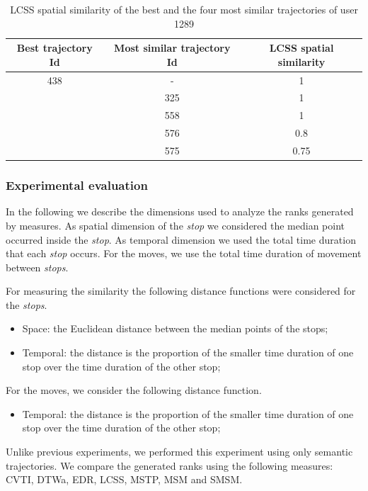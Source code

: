 \documentclass[12pt]{article}
\begin{document}
\begin{table}[!h]
\scriptsize
  \centering
  \begin{tabular}{|c|c|c|}
  	\hline
 Best trajectory Id & Most similar trajectory Id & LCSS spatial similarity \\
  	\hline
 438 & - & 1 \\
  & 325 & 1 \\
  & 558 & 1 \\
  & 576 & 0.8 \\
  & 575 & 0.75 \\
    \hline
  \end{tabular}
  \caption{LCSS spatial similarity of the best and the four most similar trajectories of user 1289}
  \label{tab:involves_best_similarities}
\end{table}


\subsubsection{Experimental evaluation}
In the following we describe the dimensions used to analyze the ranks generated by measures. As spatial dimension of the \emph{stop} we considered the median point occurred inside the \emph{stop}. As temporal dimension we used the total time duration that each \emph{stop} occurs. For the moves, we use the total time duration of movement between \emph{stops}.

For measuring the similarity the following distance functions were considered for the \emph{stops}.

\begin{itemize}
  \item Space: the Euclidean distance between the median points of the stops;
  \item Temporal: the distance is the proportion of the smaller time duration of one stop over the time duration of the other stop;
\end{itemize}

For the moves, we consider the following distance function.
\begin{itemize}
  \item Temporal: the distance is the proportion of the smaller time duration of one stop over the time duration of the other stop;
\end{itemize}

Unlike previous experiments, we performed this experiment using only semantic trajectories. We compare the generated ranks using the following measures: CVTI, DTWa, EDR, LCSS, MSTP, MSM and SMSM.
\end{document}
